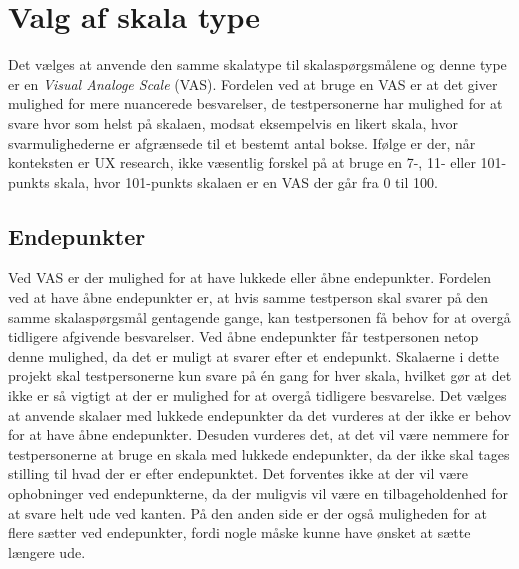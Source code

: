 \section{Valg af skala type}
\label{ParametreSkalaType}
%
Det vælges at anvende den samme skalatype til skalaspørgsmålene og denne type er en \textit{Visual Analoge Scale} (VAS). Fordelen ved at bruge en VAS er at det giver mulighed for mere nuancerede besvarelser, de testpersonerne har mulighed for at svare hvor som helst på skalaen, modsat eksempelvis en likert skala, hvor svarmulighederne er afgrænsede til et bestemt antal bokse. \blankline
%
Ifølge \textcite[s. 73]{PDF:RatingScales} er der, når konteksten er UX research, ikke væsentlig forskel på at bruge en 7-, 11- eller 101-punkts skala, hvor 101-punkts skalaen er en VAS der går fra 0 til 100.  
%
\subsection{Endepunkter}
Ved VAS er der mulighed for at have lukkede eller åbne endepunkter. Fordelen ved at have åbne endepunkter er, at hvis samme testperson skal svarer på den samme skalaspørgsmål gentagende gange, kan testpersonen få behov for at overgå tidligere afgivende besvarelser. Ved åbne endepunkter får testpersonen netop denne mulighed, da det er muligt at svarer efter et endepunkt. Skalaerne i dette projekt skal testpersonerne kun svare på én gang for hver skala, hvilket gør at det ikke er så vigtigt at der er mulighed for at overgå tidligere besvarelse. \blankline
%
Det vælges at anvende skalaer med lukkede endepunkter da det vurderes at der ikke er behov for at have åbne endepunkter. Desuden vurderes det, at det vil være nemmere for testpersonerne at bruge en skala med lukkede endepunkter, da der ikke skal tages stilling til hvad der er efter endepunktet. Det forventes ikke at der vil være ophobninger ved endepunkterne, da der muligvis vil være en tilbageholdenhed for at svare helt ude ved kanten. På den anden side er der også muligheden for at flere sætter ved endepunkter, fordi nogle måske kunne have ønsket at sætte længere ude. 
%
%
